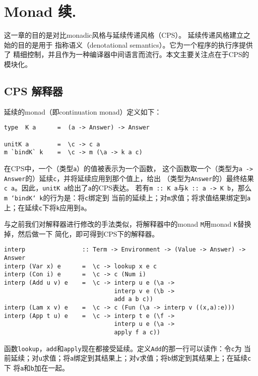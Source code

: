 \documentclass[12pt]{article}
\begin{document}
\vspace{-0.8em}
\section{Monad 续.}
\indent{}这一章的目的是对比monadic风格与延续传递风格（CPS）。
延续传递风格建立之始的目的是用于 指称语义（denotational semantics）。它为一个程序的执行序提供了
精细控制，并且作为一种编译器中间语言而流行。本文主要关注点在于CPS的模块化。

\subsection{CPS 解释器}
\noindent{}延续的monad（即continuation monad）定义如下：
\begin{verbatim}
type  K a      =  (a -> Answer) -> Answer

unitK a        =  \c -> c a
m `bindK` k    =  \c -> m (\a -> k a c)
\end{verbatim}

\indent{}在CPS中，一个（类型\texttt{a}）的值被表示为一个函数，
这个函数取一个（类型为\texttt{a -> Answer}的）延续\texttt{c}，并将延续应用到那个值上，给出
（类型为\texttt{Answer}的）最终结果\texttt{c a}。因此，\texttt{unitK a}给出了\texttt{a}的CPS表达。
若有\texttt{m :: K a}与\texttt{k :: a -> K b}，那么\texttt{m `bindK` k}的行为是：将\texttt{c}绑定到
当前的延续上；对\texttt{m}求值；将求值结果绑定到\texttt{a}上；在延续\texttt{c}下将\texttt{k}应用到\texttt{a}。

\indent{}与之前我们对解释器进行修改的手法类似，将解释器中的monad \texttt{M}用monad \texttt{K}替换掉，然后做一下
简化，即可得到CPS下的解释器。

\begin{verbatim}
interp                :: Term -> Environment -> (Value -> Answer) -> Answer
interp (Var x) e      =  \c -> lookup x e c
interp (Con i) e      =  \c -> c (Num i)
interp (Add u v) e    =  \c -> interp u e (\a ->
                               interp v e (\b ->
                               add a b c))
interp (Lam x v) e    =  \c -> c (Fun (\a -> interp v ((x,a):e)))
interp (App t u) e    =  \c -> interp t e (\f ->
                               interp u e (\a ->
                               apply f a c))
\end{verbatim}
\noindent{}函数\texttt{lookup}，\texttt{add}和\texttt{apply}现在都接受延续。定义\texttt{Add}的那一行可以读作：令\texttt{c}为
当前延续；对\texttt{u}求值；将\texttt{a}绑定到其结果上；对\texttt{v}求值；将\texttt{b}绑定到其结果上；在延续\texttt{c}下
将\texttt{a}和\texttt{b}加在一起。
\end{document}
